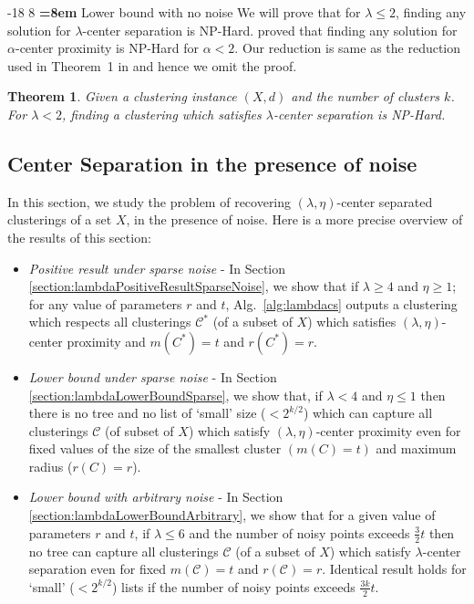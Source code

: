 \documentclass[12pt]{article}
\makeatletter
\newtheorem{theorem}{Theorem}
\newcommand{\mc}{\mathcal}
\renewcommand\subsubsection{\@startsection{subsubsection}{3}{\z@}%
   {-18\p@ \@plus -4\p@ \@minus -4\p@}%
   {8\p@ \@plus 4\p@ \@minus 4\p@}%
   {\normalfont\normalsize\bfseries\boldmath
   \rightskip=\z@ \@plus 8em \pretolerance=10000}}
\makeatother
\begin{document}

\subsubsection{Lower bound with no noise}
\label{section:lowerBdNoNoiseLambda}
We will prove that for $\lambda \le 2$, finding any solution for $\lambda$-center separation is NP-Hard. \cite{reyzin2012data} proved that finding any solution for $\alpha$-center proximity is NP-Hard for $\alpha < 2$. Our reduction is same as the reduction used in Theorem~1 in \cite{reyzin2012data} and hence we omit the proof.

\begin{theorem}
\label{thm:lambdaNoNoiseLowerBd}
Given a clustering instance $(X, d)$ and the number of clusters $k$. For $\lambda < 2$, finding a clustering which satisfies $\lambda$-center separation is NP-Hard.
\end{theorem}

\subsection{Center Separation in the presence of noise}
\label{sec:cswith}
In this section, we study the problem of recovering $(\lambda, \eta)$-center separated clusterings of a set $X$, in the presence of noise. Here is a more precise overview of the results of this section:
\begin{itemize}[nolistsep,noitemsep,leftmargin=*]
\item  {\it Positive result under sparse noise} - In Section \ref{section:lambdaPositiveResultSparseNoise}, we show that if $\lambda \ge 4$ and $\eta \ge 1$; for any value of parameters $r$ and $t$, Alg.~\ref{alg:lambdacs} outputs a clustering which respects all clusterings $\mc C^*$ (of a subset of $X$) which satisfies $(\lambda, \eta)$-center proximity and $m(C^*)=t$ and $r(C^*) = r$.
\item  {\it Lower bound under sparse noise} - In Section \ref{section:lambdaLowerBoundSparse}, we show that, if $\lambda < 4$ and $\eta \le 1$ then there is no tree and no list of `small' size ($<2^{k/2}$) which can capture all clusterings $\mc C$ (of subset of $X$) which satisfy $(\lambda, \eta)$-center proximity even for fixed values of the size of the smallest cluster $(m(C) = t)$ and maximum radius ($r(C) = r$).
\item {\it Lower bound with arbitrary noise} - In Section \ref{section:lambdaLowerBoundArbitrary}, we show that for a given value of parameters $r$ and $t$, if $\lambda \le 6$ and the number of noisy points exceeds $\frac{3}{2}t$ then no tree can capture all clusterings $\mc C$ (of a subset of $X$) which satisfy $\lambda$-center separation even for fixed $m(\mc C) = t$ and $r(\mc C) = r$. Identical result holds for `small' ($<2^{k/2}$) lists if the number of noisy points exceeds $\frac{3k}{2}t$.
\end{itemize}
\end{document}
